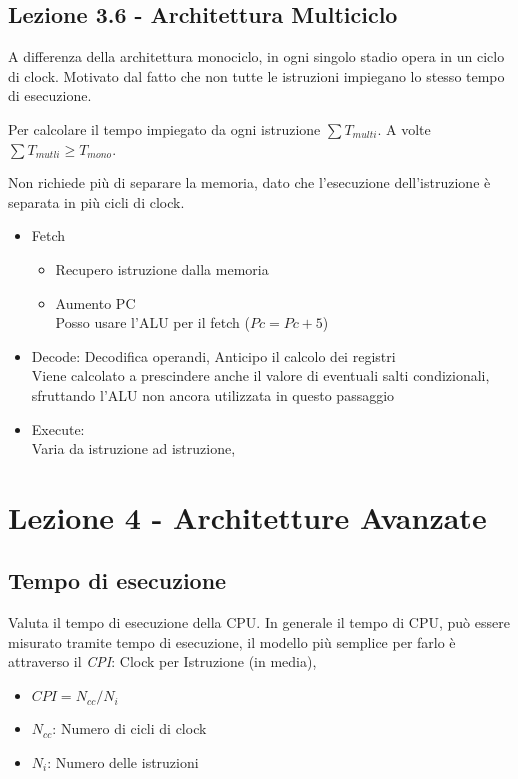 \documentclass[a4paper,10pt]{article}
\begin{document}
\subsection{Lezione 3.6 - Architettura Multiciclo}
A differenza della architettura monociclo, in ogni singolo stadio opera in un ciclo di clock.
Motivato dal fatto che non tutte le istruzioni impiegano lo stesso tempo di esecuzione.

Per calcolare il tempo impiegato da ogni istruzione $\sum{T_{multi}}$.
A volte $\sum{T_{mutli}} \ge T_{mono}$.

Non richiede più di separare la memoria, dato che l'esecuzione dell'istruzione è separata in più cicli di clock.

\begin{itemize}
    \item Fetch
        \begin{itemize}
            \item Recupero istruzione dalla memoria
            \item Aumento PC
                \\
                Posso usare l'ALU per il fetch ($Pc = Pc + 5$)
        \end{itemize}
    \item Decode:
        Decodifica operandi, Anticipo il calcolo dei registri
        \\
        Viene calcolato a prescindere anche il valore di eventuali salti condizionali,
        sfruttando l'ALU non ancora utilizzata in questo passaggio

    \item Execute:
        \\
        Varia da istruzione ad istruzione,
\end{itemize}

\section{Lezione 4 - Architetture Avanzate}

\subsection{Tempo di esecuzione}
Valuta il tempo di esecuzione della CPU.
In generale il tempo di CPU, può essere misurato tramite tempo di esecuzione, il modello più semplice per farlo è attraverso il
\textit{CPI}: Clock per Istruzione (in media),

\begin{itemize}
    \item $CPI = N_{cc}/N_i$
    \item $N_{cc}$: Numero di cicli di clock
    \item $N_i$: Numero delle istruzioni
\end{itemize}
\end{document}

